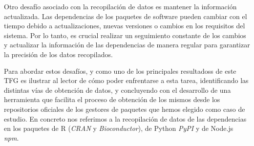 Otro desafío asociado con la recopilación de datos es mantener la información actualizada. Las dependencias de los 
paquetes de software pueden cambiar con el tiempo debido a actualizaciones, nuevas versiones o cambios en los requisitos 
del sistema. Por lo tanto, es crucial realizar un seguimiento constante de los cambios y actualizar la información 
de las dependencias de manera regular para garantizar la precisión de los datos recopilados.


Para abordar estos desafíos, y como uno de los principales resultadoss de este TFG es ilustrar al 
lector de cómo poder enfrentarse a esta tarea, identificando las distintas vías de obtención de datos, y concluyendo 
con el desarrollo de una herramienta que facilita el proceso de obtención de los mismos desde los repositorios
oficiales de los gestores de paquetes que hemos elegido como caso de estudio.  En concreto nos referimos a la 
recopilación de datos de las dependencias en los paquetes de R (\textit{CRAN} y \textit{Bioconductor}), de Python \textit{PyPI} y de Node.js \textit{npm}.
